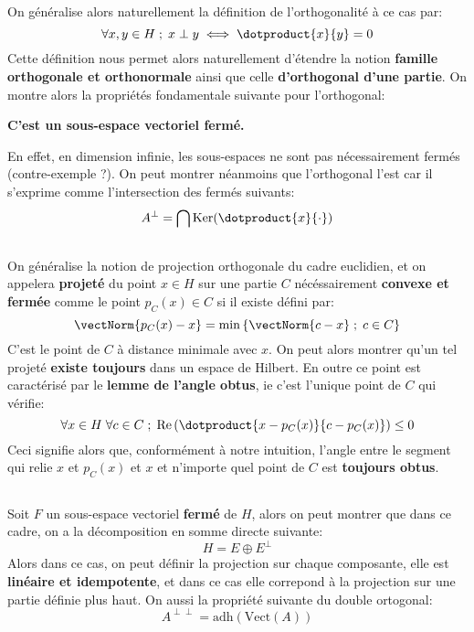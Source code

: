 \subsection*{}
On généralise alors naturellement la définition de l'orthogonalité à ce cas par:
\[ 
   \forall x, y \in H \; ; \; x \perp y \iff \dotproduct{x}{y} = 0
\]
Cette définition nous permet alors naturellement d'étendre la notion \textbf{famille orthogonale et orthonormale} ainsi que celle \textbf{d'orthogonal d'une partie}. On montre alors la propriétés fondamentale suivante pour l'orthogonal:
\begin{center}
   \textbf{C'est un sous-espace vectoriel fermé.}
\end{center}
En effet, en dimension infinie, les sous-espaces ne sont pas nécessairement fermés (contre-exemple ?). On peut montrer néanmoins que l'orthogonal l'est car il s'exprime comme l'intersection des fermés suivants:
\[ 
   A^\perp = \bigcap \text{Ker}(\dotproduct{x}{\cdot}) 
\]
\subsection*{}
On généralise la notion de projection orthogonale du cadre euclidien, et on appelera \textbf{projeté} du point \( x \in H \) sur une partie \( C \) nécéssairement \textbf{convexe et fermée} comme le point \(p_C(x) \in C\) si il existe défini par:
\[ 
   \vectNorm{p_C(x) - x} = \min\left\{ \vectNorm{c - x} \; ; \; c \in C \right\} 
\]
C'est le point de \( C \) à distance minimale avec \( x \). On peut alors montrer qu'un tel projeté \textbf{existe toujours} dans un espace de Hilbert. En outre ce point est caractérisé par le \textbf{lemme de l'angle obtus}, ie c'est l'unique point de \( C \) qui vérifie:
\[ 
   \forall x \in H \; \forall c \in C \; ; \; \text{Re}\left(\dotproduct{x - p_C(x)}{c - p_C(x)}\right) \leq 0 
\]
Ceci signifie alors que, conformément à notre intuition, l'angle entre le segment qui relie \(x\) et \( p_C(x) \) et \( x \) et n'importe quel point de \( C \) est \textbf{toujours obtus}.
\pagebreak
\subsection*{}
Soit \( F \) un sous-espace vectoriel \textbf{fermé} de \( H \), alors on peut montrer que dans ce cadre, on a la décomposition en somme directe suivante:
\[ 
   H = E \oplus E^\perp 
\]
Alors dans ce cas, on peut définir la projection sur chaque composante, elle est \textbf{linéaire et idempotente}, et dans ce cas elle correpond à la projection sur une partie définie plus haut. On aussi la propriété suivante du double ortogonal:
\[ 
   A^{\perp\perp} = \text{adh}(\text{Vect}(A))
\]
